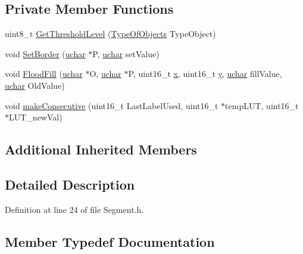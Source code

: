 \subsection*{Private Member Functions}
\begin{DoxyCompactItemize}
\item 
uint8\+\_\+t \hyperlink{class_vision_1_1_segment_a1b15d616db9cbdcd0b07bb267f60895b}{Get\+Threshold\+Level} (\hyperlink{class_vision_1_1_segment_ac3ddf2c72ee6333007510b680db1e7dd}{Type\+Of\+Objects} Type\+Object)
\item 
void \hyperlink{class_vision_1_1_segment_ae3349aa3725f883943fb316c0d52752d}{Set\+Border} (\hyperlink{_soil_math_types_8h_a65f85814a8290f9797005d3b28e7e5fc}{uchar} $\ast$P, \hyperlink{_soil_math_types_8h_a65f85814a8290f9797005d3b28e7e5fc}{uchar} set\+Value)
\item 
void \hyperlink{class_vision_1_1_segment_a62e29f1cc5db86f670c488966a06d644}{Flood\+Fill} (\hyperlink{_soil_math_types_8h_a65f85814a8290f9797005d3b28e7e5fc}{uchar} $\ast$O, \hyperlink{_soil_math_types_8h_a65f85814a8290f9797005d3b28e7e5fc}{uchar} $\ast$P, uint16\+\_\+t \hyperlink{_v_s_a___u_t_2_comparision_pictures_2_createtest_image_8m_a9336ebf25087d91c818ee6e9ec29f8c1}{x}, uint16\+\_\+t \hyperlink{_v_s_a___u_t_2_comparision_pictures_2_createtest_image_8m_a2fb1c5cf58867b5bbc9a1b145a86f3a0}{y}, \hyperlink{_soil_math_types_8h_a65f85814a8290f9797005d3b28e7e5fc}{uchar} fill\+Value, \hyperlink{_soil_math_types_8h_a65f85814a8290f9797005d3b28e7e5fc}{uchar} Old\+Value)
\item 
void \hyperlink{class_vision_1_1_segment_a3543a9696469dc07718c8227eaeaf9c0}{make\+Consecutive} (uint16\+\_\+t Last\+Label\+Used, uint16\+\_\+t $\ast$temp\+L\+U\+T, uint16\+\_\+t $\ast$L\+U\+T\+\_\+new\+Val)
\end{DoxyCompactItemize}
\subsection*{Additional Inherited Members}


\subsection{Detailed Description}


Definition at line 24 of file Segment.\+h.



\subsection{Member Typedef Documentation}
\hypertarget{class_vision_1_1_segment_add6c81230e499b159218c5232e3b76ae}{}
